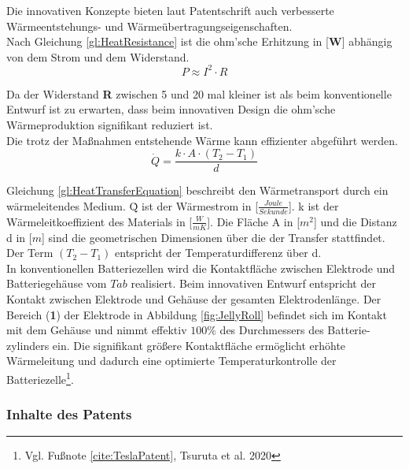 Die innovativen Konzepte bieten laut Patentschrift auch verbesserte Wärmeentstehungs- und Wärmeübertragungseigenschaften.\\
Nach Gleichung \ref{gl:HeatResistance} ist die ohm'sche Erhitzung in [\textbf{W}] abhängig von dem Strom und dem Widerstand. 
\begin{equation}
	 P \approx I^{2} \cdot R
	 \label{gl:HeatResistance}
\end{equation}

Da der Widerstand \textbf{R} zwischen 5 und 20 mal kleiner ist als beim konventionelle Entwurf ist zu erwarten, dass beim innovativen Design die ohm'sche Wärmeproduktion signifikant reduziert ist.\\
Die trotz der Maßnahmen entstehende Wärme kann effizienter abgeführt werden.
\begin{equation}
	\dot{Q} = \frac{k\cdot A\cdot (T_{2} - T_{1})}{d} 
	\label{gl:HeatTransferEquation}
\end{equation}

Gleichung \ref{gl:HeatTransferEquation} beschreibt den Wärmetransport durch ein wärmeleitendes Medium. \.{Q} ist der Wärmestrom in [\textbf{$\frac{Joule}{Sekunde}$}]. k ist der Wärmeleitkoeffizient des Materials in [\textbf{$\frac{W}{mK}$}].
Die Fläche A in [\textbf{$m^{2}$}] und die Distanz d in [\textbf{$m$}] sind die geometrischen Dimensionen über die der Transfer stattfindet. Der Term $(T_{2}-T_{1})$ entspricht der Temperaturdifferenz über d.\\
In konventionellen Batteriezellen wird die Kontaktfläche zwischen Elektrode und Batteriegehäuse vom $Tab$ realisiert. Beim innovativen Entwurf entspricht der Kontakt zwischen Elektrode und Gehäuse der gesamten Elektrodenlänge. Der Bereich (\textbf{1}) der Elektrode in Abbildung \ref{fig:JellyRoll} befindet sich im Kontakt mit dem Gehäuse und nimmt effektiv $100\percent$ des Durchmessers des Batterie-\newline zylinders ein. Die signifikant größere Kontaktfläche ermöglicht erhöhte Wärmeleitung und dadurch eine optimierte Temperaturkontrolle der Batteriezelle\footnote{Vgl. Fußnote \ref{cite:TeslaPatent}, Tsuruta et al. 2020}.\\

\subsubsection*{Inhalte des Patents}\label{subsub:PatentContents}


